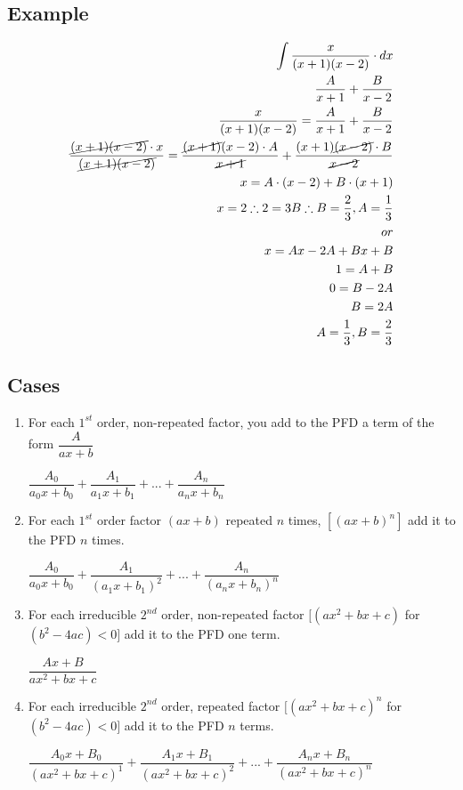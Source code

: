 \documentclass{article}
\begin{document}
\subsection*{Example}
\begin{equation}
\begin{aligned}
\int \dfrac{x}{(x+1)(x-2)} \cdot dx\\
\dfrac{A}{x+1}+\dfrac{B}{x-2}\\
\dfrac{x}{(x+1)(x-2)}=\dfrac{A}{x+1}+\dfrac{B}{x-2}\\
\dfrac{\cancel{(x+1)(x-2)} \cdot x}{\cancel{(x+1)(x-2)} }=\dfrac{\cancel{(x+1)}(x-2) \cdot A}{\cancel{x+1} }+\dfrac{(x+1)\cancel{(x-2)} \cdot B}{\cancel{x-2} }\\
x=A \cdot (x-2)+B \cdot (x+1)\\
x=2 \therefore 2=3B \therefore B=\dfrac{2}{3}, A=\dfrac{1}{3} \\
or\\
x=Ax-2A+Bx+B\\
1=A+B\\
0=B-2A\\
B=2A\\
A=\dfrac{1}{3}, B=\dfrac{2}{3}
\end{aligned}
\end{equation}
\subsection*{Cases}
\begin{enumerate}
\item For each $1^{st}$ order, non-repeated factor, you add to the PFD a term of the form $\dfrac{A}{ax+b}$\\
\begin{center}
$ \dfrac{A_0}{a_0x+b_0}+\dfrac{A_1}{a_1x+b_1}+...+\dfrac{A_n}{a_nx+b_n} $
\end{center}
\item For each $1^{st}$ order factor $(ax+b)$ repeated $n$ times, $[(ax+b)^n]$ add it to the PFD $n$ times.
\begin{center}
$ \dfrac{A_0}{a_0x+b_0}+\dfrac{A_1}{(a_1x+b_1)^2}+...+\dfrac{A_n}{(a_nx+b_n)^n} $
\end{center}
\item For each irreducible $2^{nd}$ order, non-repeated factor $[(ax^2+bx+c)$ for $(b^2-4ac)<0]$ add it to the PFD one term.
\begin{center}
$ \dfrac{Ax+B}{ax^2+bx+c} $
\end{center}
\item For each irreducible $2^{nd}$ order, repeated factor $[(ax^2+bx+c)^n$ for $(b^2-4ac)<0]$ add it to the PFD $n$ terms.
\begin{center}
$ \dfrac{A_0x+B_0}{(ax^2+bx+c)^1}+\dfrac{A_1x+B_1}{(ax^2+bx+c)^2}+...+\dfrac{A_nx+B_n}{(ax^2+bx+c)^n}$
\end{center}
\end{enumerate}
\end{document}
